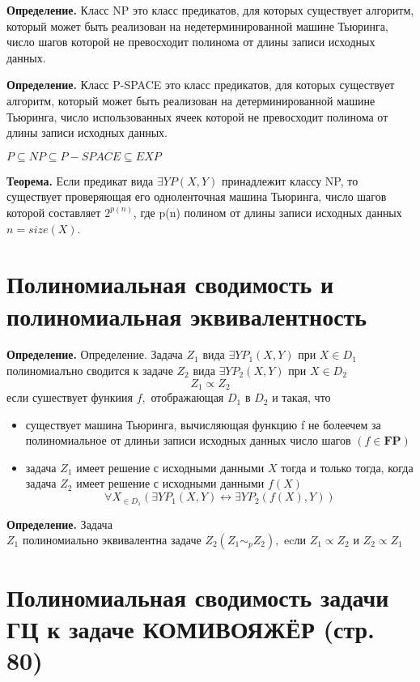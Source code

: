\documentclass[40pt]{article}
\begin{document}
\textbf{Определение.} Класс NP это класс предикатов, для которых существует алгоритм, который может быть реализован на недетерминированной машине Тьюринга, число шагов которой не превосходит полинома
от длины записи исходных данных.

\textbf{Определение.} Класс P-SPACE это класс предикатов, для которых существует алгоритм, который может быть реализован на детерминированной машине Тьюринга, число использованных ячеек которой
не превосходит полинома от длины записи исходных данных.

$P \subseteq NP \subseteq P-SPACE \subseteq EXP$

\textbf{Теорема.} Если предикат вида $\exists Y P(X, Y )$ принадлежит классу
NP, то существует проверяющая его одноленточная машина Тьюринга, число шагов которой составляет $2^{p(n)}$, где p(n) полином от длины записи исходных данных $n = size(X)$.

\section{Полиномиальная сводимость и полиномиальная эквивалентность}

\textbf{Определение.} Определение. Задача $Z_{1}$ вида $\exists Y P_{1}(X, Y)$ при $X \in D_{1}$ полиномиалъно сводится к задаче $Z_{2}$ вида $\exists Y P_{2}(X, Y)$ при $X \in D_{2}$
$$
Z_{1} \propto Z_{2}
$$
если сушествует функиия $f,$ отображающая $D_{1}$ в $D_{2}$ и такая, что
\begin{itemize}
    \item существует машина Тьюринга, вычисляющая функцию f не болеечем за полиномиальное от длиньи записи исходных данных число шагов $(f \in \mathbf{F P})$
    \item задача $Z_{1}$ имеет решение с исходными данными $X$ тогда и только тогда, когда задача $Z_{2}$ имеет решение с исходными данными $f(X)$
$$
\forall X_{\in D_{1}}\left(\exists Y P_{1}(X, Y) \leftrightarrow \exists Y P_{2}(f(X), Y)\right)
$$
\end{itemize}


 \textbf{Определение.} Задача  $Z_{1} \text { полиномиально эквивалентна задаче } Z_{2}
\left(Z_{1} \sim_{p} Z_{2}\right), \text { ecли } Z_{1} \propto Z_{2} \text { и } Z_{2} \propto Z_{1}$

\section{Полиномиальная сводимость задачи ГЦ к задаче КОМИВОЯЖЁР (стр. 80)}
\end{document}
